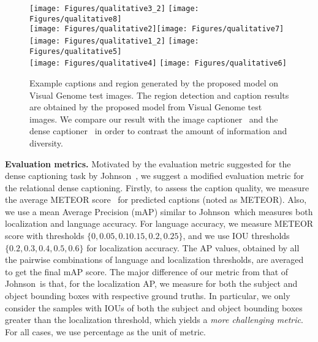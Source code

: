 


\begin{figure*}[t]
\vspace{-2mm}
\centering
{\texttt{[image: Figures/qualitative3\_2]}}
{\texttt{[image: Figures/qualitative8]}}\\
{\texttt{[image: Figures/qualitative2]}}{\texttt{[image: Figures/qualitative7]}}\\
{\texttt{[image: Figures/qualitative1\_2]}}
{\texttt{[image: Figures/qualitative5]}}\\
{\texttt{[image: Figures/qualitative4]}}
{\texttt{[image: Figures/qualitative6]}}\\
\vspace{-2mm}
\caption{Example captions and region generated by the proposed model on Visual Genome test images. 
The region detection and caption results are obtained by the proposed model from Visual Genome test images. 
   We compare our result with the image captioner~\cite{vinyals2015show} and the dense captioner~\cite{johnson2016densecap} in order to contrast the amount of information and diversity.
   \vspace{-2mm}}
\label{fig:qualitative}
\end{figure*}


\noindent\textbf{Evaluation metrics.}
Motivated by the evaluation metric suggested for the dense captioning task by Johnson~\etal\cite{johnson2016densecap},
we suggest a modified evaluation metric for the relational dense captioning.
{
Firstly, to assess the caption quality, we measure the average METEOR score~\cite{denkowski2014meteor} for predicted captions (noted as METEOR). 
Also, we use a mean Average Precision (mAP) similar to  Johnson~\etal which measures both localization and language accuracy.
For language accuracy,
we measure METEOR score with thresholds $\{ 0, 0.05, 0.1 0.15, 0.2, 0.25\}$, 
and we use IOU thresholds $\{0.2, 0.3, 0.4, 0.5, 0.6\}$ for localization accuracy.}
The AP values, obtained by all the pairwise combinations of language and localization thresholds, are averaged to get the final mAP score.
The major difference of our metric from that of Johnson~\etal is that, for the localization AP, we measure for both the subject and object bounding boxes with respective ground truths. 
In particular, we only consider the samples with IOUs of both the subject and object bounding boxes greater than the localization threshold, which yields a \emph{more challenging metric}.
For all cases, we use percentage as the unit of metric.



